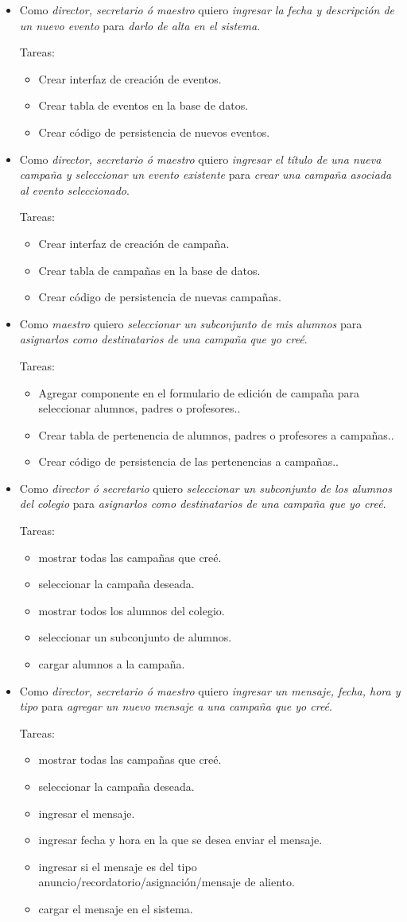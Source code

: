 \documentclass[a4paper, 10pt, twoside]{article}
\newenvironment{stories}{
  \begin{itemize}
}{
  \end{itemize}
}
\newcommand{\story}[3]{
  \item
  Como \emph{#1} quiero \emph{#2} para \emph{#3}.
}
\newenvironment{tasks}{
  Tareas:
  \begin{itemize}
}{
  \end{itemize}
}
\newcommand{\task}[1] {
  \item #1.
}
\begin{document}
\begin{stories}
  \story{director, secretario ó maestro}
        {ingresar la fecha y descripción de un nuevo evento}
        {darlo de alta en el sistema}

  \begin{tasks}
    \task{Crear interfaz de creación de eventos}
    \task{Crear tabla de eventos en la base de datos}
    \task{Crear código de persistencia de nuevos eventos}
  \end{tasks}

  \story{director, secretario ó maestro}
        {ingresar el título de una nueva campaña y seleccionar un evento existente}
        {crear una campaña asociada al evento seleccionado}

  \begin{tasks}
    \task{Crear interfaz de creación de campaña}
    \task{Crear tabla de campañas en la base de datos}
    \task{Crear código de persistencia de nuevas campañas}
  \end{tasks}

  \story{maestro}
        {seleccionar un subconjunto de mis alumnos}
        {asignarlos como destinatarios de una campaña que yo creé}

  \begin{tasks}
    \task{Agregar componente en el formulario de edición de campaña para seleccionar alumnos, padres o profesores.}
    \task{Crear tabla de pertenencia de alumnos, padres o profesores a campañas.}
    \task{Crear código de persistencia de las pertenencias a campañas.}
  \end{tasks}

  \story{director ó secretario}
        {seleccionar un subconjunto de los alumnos del colegio}
        {asignarlos como destinatarios de una campaña que yo creé}

  \begin{tasks}
    \task{mostrar todas las campañas que creé}
    \task{seleccionar la campaña deseada}
    \task{mostrar todos los alumnos del colegio}
    \task{seleccionar un subconjunto de alumnos}
    \task{cargar alumnos a la campaña}
  \end{tasks}

  \story{director, secretario ó maestro}
        {ingresar un mensaje, fecha, hora y tipo}
        {agregar un nuevo mensaje a una campaña que yo creé}

  \begin{tasks}
    \task{mostrar todas las campañas que creé}
    \task{seleccionar la campaña deseada}
    \task{ingresar el mensaje}
    \task{ingresar fecha y hora en la que se desea enviar el mensaje}
    \task{ingresar si el mensaje es del tipo anuncio/recordatorio/asignación/mensaje de aliento}
    \task{cargar el mensaje en el sistema}
  \end{tasks}


\end{stories}
\end{document}
